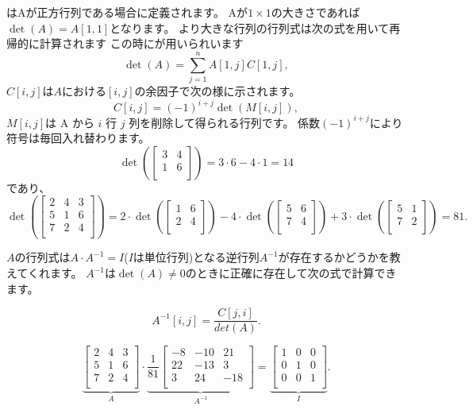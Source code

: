 
はAが正方行列である場合に定義されます。
Aが$1 \times 1$の大きさであれば$\det(A)=A[1,1]$となります。
より大きな行列の行列式は次の式を用いて再帰的に計算されます
この時にが用いられいます
\[\det(A)=\sum_{j=1}^n A[1,j] C[1,j],\]
$C[i,j]$は$A$における$[i,j]$の余因子で次の様に示されます。
\[C[i,j] = (-1)^{i+j} \det(M[i,j]),\]
$M[i,j]$は A から $i$ 行 $j$ 列を削除して得られる行列です。
係数$(-1)^{i+j}$により符号は毎回入れ替わります。
\[
\det(
 \begin{bmatrix}
  3 & 4 \\
  1 & 6 \\
 \end{bmatrix}
) = 3 \cdot 6 - 4 \cdot 1 = 14
\]
であり、
\[
\det(
 \begin{bmatrix}
  2 & 4 & 3 \\
  5 & 1 & 6 \\
  7 & 2 & 4 \\
 \end{bmatrix}
) =
2 \cdot
\det(
 \begin{bmatrix}
  1 & 6 \\
  2 & 4 \\
 \end{bmatrix}
)
-4 \cdot
\det(
 \begin{bmatrix}
  5 & 6 \\
  7 & 4 \\
 \end{bmatrix}
)
+3 \cdot
\det(
 \begin{bmatrix}
  5 & 1 \\
  7 & 2 \\
 \end{bmatrix}
) = 81.
\]


$A$の行列式は$A \cdot A^{-1} = I$($I$は単位行列)となる逆行列$A^{-1}$が存在するかどうかを教えてくれます。
$A^{-1}$は$\det(A) \neq 0$のときに正確に存在して次の式で計算できます。

\[A^{-1}[i,j] = \frac{C[j,i]}{det(A)}.\]

\[
\underbrace{
 \begin{bmatrix}
  2 & 4 & 3\\
  5 & 1 & 6\\
  7 & 2 & 4\\
 \end{bmatrix}
}_{A}
\cdot
\underbrace{
 \frac{1}{81}
 \begin{bmatrix}
   -8 & -10 & 21 \\
   22 & -13 & 3 \\
   3 & 24 & -18 \\
 \end{bmatrix}
}_{A^{-1}}
=
\underbrace{
 \begin{bmatrix}
  1 & 0 & 0 \\
  0 & 1 & 0 \\
  0 & 0 & 1 \\
 \end{bmatrix}
}_{I}.
\]

